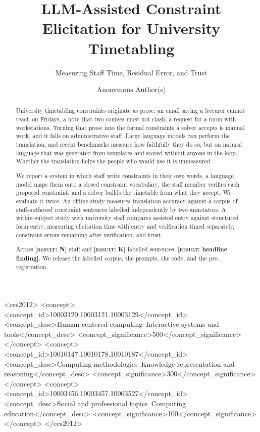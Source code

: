 \documentclass[acmsmall,screen,review,anonymous]{acmart}
\newcommand{\result}[1]{\textbf{[\textsc{result}: #1]}}
\begin{document}
\title{LLM-Assisted Constraint Elicitation for University Timetabling}
\subtitle{Measuring Staff Time, Residual Error, and Trust}

\author{Anonymous Author(s)}

\begin{abstract}
University timetabling constraints originate as prose: an email saying a
lecturer cannot teach on Fridays, a note that two courses must not clash, a
request for a room with workstations. Turning that prose into the formal
constraints a solver accepts is manual work, and it falls on administrative
staff. Large language models can perform the translation, and recent
benchmarks measure how faithfully they do so, but on natural language that was
generated from templates and scored without anyone in the loop. Whether the
translation helps the people who would use it is unmeasured.

We report a system in which staff write constraints in their own words, a
language model maps them onto a closed constraint vocabulary, the staff member
verifies each proposed constraint, and a solver builds the timetable from what
they accept. We evaluate it twice. An offline study measures translation
accuracy against a corpus of staff-authored constraint sentences labelled
independently by two annotators. A within-subject study with university staff
compares assisted entry against structured form entry, measuring elicitation
time with entry and verification timed separately, constraint errors remaining
after verification, and trust.

Across \result{N} staff and \result{K} labelled sentences, \result{headline
finding}. We release the labelled corpus, the prompts, the code, and the
pre-registration.
\end{abstract}

\begin{CCSXML}
<ccs2012>
<concept>
<concept_id>10003120.10003121.10003129</concept_id>
<concept_desc>Human-centered computing~Interactive systems and tools</concept_desc>
<concept_significance>500</concept_significance>
</concept>
<concept>
<concept_id>10010147.10010178.10010187</concept_id>
<concept_desc>Computing methodologies~Knowledge representation and reasoning</concept_desc>
<concept_significance>300</concept_significance>
</concept>
<concept>
<concept_id>10003456.10003457.10003527</concept_id>
<concept_desc>Social and professional topics~Computing education</concept_desc>
<concept_significance>100</concept_significance>
</concept>
</ccs2012>
\end{CCSXML}
\end{document}
